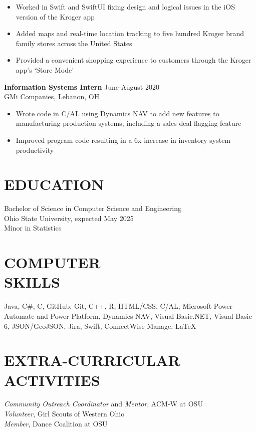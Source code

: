 \documentclass[margin]{res}
\begin{document}
\begin{resume}
\begin{itemize}
                    \item Worked in Swift and SwiftUI fixing design and logical  issues in the iOS version of the Kroger app
                    \item Added maps and real-time location tracking to five hundred Kroger brand family stores across the United States
                    \item Provided a convenient shopping experience to customers through the Kroger app's ‘Store Mode’
                   \end{itemize} 
                {\bf Information Systems Intern} \hfill June-August 2020\\
                GMi Companies, Lebanon, OH
                \begin {itemize}
                    \item  Wrote code in C/AL using Dynamics NAV to add new features to manufacturing production systems, including a sales deal flagging feature
                    \item  Improved program code resulting in a 6x increase in inventory system productivity
                \end{itemize}

\section{EDUCATION} Bachelor of Science in Computer Science and Engineering\\
                Ohio State University, expected May 2025 \\
                Minor in Statistics
                
 
 
\section{COMPUTER \\ SKILLS} Java, C\#, C, GitHub, Git, C++, R, HTML/CSS, C/AL, Microsoft Power Automate and Power Platform, Dynamics NAV, Visual Basic.NET, Visual Basic 6, JSON/GeoJSON, Jira, Swift, ConnectWise Manage, \LaTeX


\section{EXTRA-CURRICULAR \\ ACTIVITIES}             
            \textit {Community Outreach Coordinator} and \textit{Mentor}, ACM-W at OSU\\
            \textit {Volunteer}, Girl Scouts of Western Ohio\\
            \textit {Member}, Dance Coalition at OSU\\
        
\end{resume}
\end{document}
